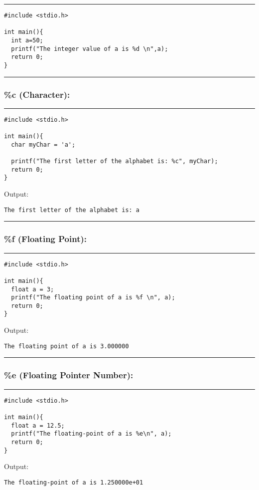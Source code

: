 \documentclass[a4paper]{article}
\begin{document}
\noindent\rule{\textwidth}{0.5pt}
\begin{verbatim}
#include <stdio.h>

int main(){
  int a=50;
  printf("The integer value of a is %d \n",a);
  return 0;
}
\end{verbatim}

\noindent\rule{\textwidth}{0.5pt}

\subsubsection{\%c (Character):}
\label{sec:org983b021}

\noindent\rule{\textwidth}{0.5pt}
\begin{verbatim}
#include <stdio.h>

int main(){
  char myChar = 'a';

  printf("The first letter of the alphabet is: %c", myChar);
  return 0;
}
\end{verbatim}
Output:
\begin{verbatim}
The first letter of the alphabet is: a
\end{verbatim}

\noindent\rule{\textwidth}{0.5pt}

\subsubsection{\%f (Floating Point):}
\label{sec:org2f20d1d}

\noindent\rule{\textwidth}{0.5pt}
\begin{verbatim}
#include <stdio.h>

int main(){
  float a = 3;
  printf("The floating point of a is %f \n", a);
  return 0;
}
\end{verbatim}
Output:
\begin{verbatim}
The floating point of a is 3.000000 
\end{verbatim}

\noindent\rule{\textwidth}{0.5pt}

\subsubsection{\%e (Floating Pointer Number):}
\label{sec:org09ec0a0}

\noindent\rule{\textwidth}{0.5pt}
\begin{verbatim}
#include <stdio.h>

int main(){
  float a = 12.5;
  printf("The floating-point of a is %e\n", a);
  return 0;
}
\end{verbatim}
Output:
\begin{verbatim}
The floating-point of a is 1.250000e+01
\end{verbatim}
\end{document}
